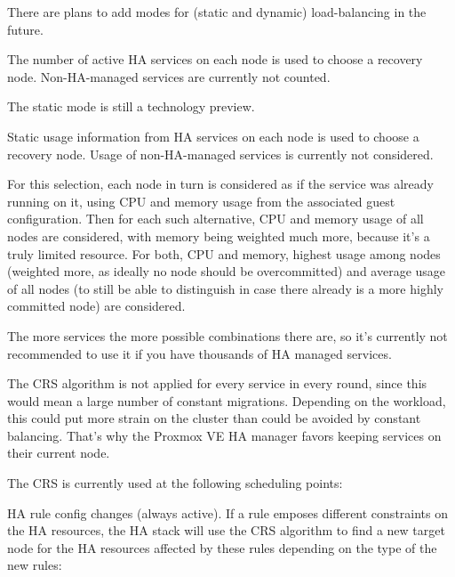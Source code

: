 There are plans to add modes for (static and dynamic) load-balancing in the future.

The number of active HA services on each node is used to choose a recovery node. Non-HA-managed services are currently not counted.

The static mode is still a technology preview.

Static usage information from HA services on each node is used to choose a recovery node. Usage of non-HA-managed services is currently not considered.

For this selection, each node in turn is considered as if the service was already running on it, using CPU and memory usage from the associated guest configuration. Then for each such alternative, CPU and memory usage of all nodes are considered, with memory being weighted much more, because it’s a truly limited resource. For both, CPU and memory, highest usage among nodes (weighted more, as ideally no node should be overcommitted) and average usage of all nodes (to still be able to distinguish in case there already is a more highly committed node) are considered.

The more services the more possible combinations there are, so it’s currently not recommended to use it if you have thousands of HA managed services.

The CRS algorithm is not applied for every service in every round, since this would mean a large number of constant migrations. Depending on the workload, this could put more strain on the cluster than could be avoided by constant balancing. That’s why the Proxmox VE HA manager favors keeping services on their current node.

The CRS is currently used at the following scheduling points:

HA rule config changes (always active). If a rule emposes different constraints on the HA resources, the HA stack will use the CRS algorithm to find a new target node for the HA resources affected by these rules depending on the type of the new rules:

